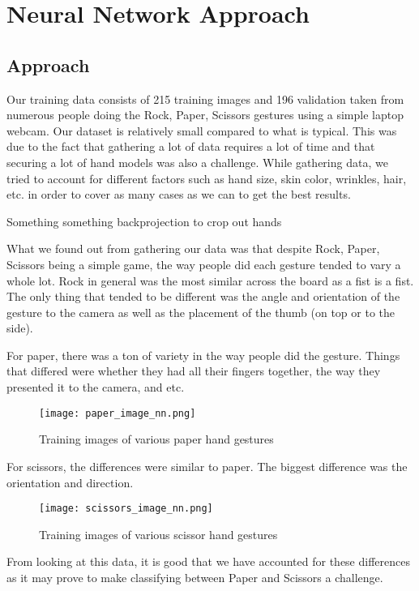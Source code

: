 
\section{Neural Network Approach}
\label{headings}

\subsection{Approach}

Our training data consists of 215 training images and 196 validation taken from numerous people doing the Rock, Paper, Scissors gestures using a simple laptop webcam. Our dataset is relatively small compared to what is typical. This was due to the fact that gathering a lot of data requires a lot of time and that securing a lot of hand models was also a challenge. While gathering data, we tried to account for different factors such as hand size, skin color, wrinkles, hair, etc. in order to cover as many cases as we can to get the best results.

Something something backprojection to crop out hands

What we found out from gathering our data was that despite Rock, Paper, Scissors being a simple game, the way people did each gesture tended to vary a whole lot. Rock in general was the most similar across the board as a fist is a fist. The only thing that tended to be different was the angle and orientation of the gesture to the camera as well as the placement of the thumb (on top or to the side).

For paper, there was a ton of variety in the way people did the gesture. Things that differed were whether they had all their fingers together, the way they presented it to the camera, and etc.

\begin{figure}[h]
\texttt{[image: paper\_image\_nn.png]}
\centering
\caption{Training images of various paper hand gestures}
\end{figure}

For scissors, the differences were similar to paper. The biggest difference was the orientation and direction.

\begin{figure}[h]
\texttt{[image: scissors\_image\_nn.png]}
\centering
\caption{Training images of various scissor hand gestures}
\end{figure}

From looking at this data, it is good that we have accounted for these differences as it may prove to make classifying between Paper and Scissors a challenge.
